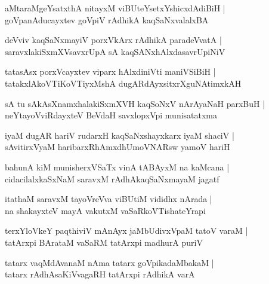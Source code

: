 \documentclass[twoside,12pt,openright]{book}
\newcounter{shloka}[chapter]
\begin{document}
\begin{shloka}%
aMtaraMgeYsatxthA nitayxM viBUteYsetxYshicxdAdiBiH |\\
goVpanAducayxtev goVpiV rAdhikA kaqSaNxvalalxBA
\end{shloka}

\begin{shloka}%
deVviv kaqSaNxmayiV porxVkArx rAdhikA paradeVvatA |\\
saravxlakiSxmXVsavxrUpA sA kaqSANxhAlxdasavrUpiNiV 
\end{shloka}

\begin{shloka}%
tatasAsx porxVcayxtev viparx hAlxdiniVti maniVSiBiH |\\
tatakxlAkoVTiKoVTiyxMshA dugARdAyxsitxrXguNAtimxkAH 
\end{shloka}

\begin{shloka}%
sA tu sAkAsXnamxhalakiSxmXVH kaqSoNxV nArAyaNaH parxBuH |\\
neYtayoVviRdayxteV BeVdaH savxlopxVpi munisatatxma
\end{shloka}

\begin{shloka}%
iyaM dugAR hariV rudarxH kaqSaNxshayxkarx iyaM shaciV |\\
sAvitirxVyaM haribarxRhAmxdhUmoVNARsw yamoV hariH
\end{shloka}

\begin{shloka}%
bahunA kiM munisherxVSaTx vinA tABAyxM na kaMcana |\\
cidacilalxkaSxNaM saravxM rAdhAkaqSaNxmayaM jagatf 
\end{shloka}

\begin{shloka}%
itathaM saravxM tayoVreVva viBUtiM vididhx nArada |\\
na shakayxteV mayA vakutxM vaSaRkoVTishateYrapi
\end{shloka}

\begin{shloka}%
terxYloVkeY paqthiviV mAnAyx jaMbUdivxVpaM tatoV varaM |\\
tatArxpi BArataM vaSaRM tatArxpi madhurA puriV 
\end{shloka}

\begin{shloka}%
tatarx vaqMdAvanaM nAma tatarx goVpikadaMbakaM |\\
tatarx rAdhAsaKiVvagaRH tatArxpi rAdhikA varA 
\end{shloka}
\end{document}
